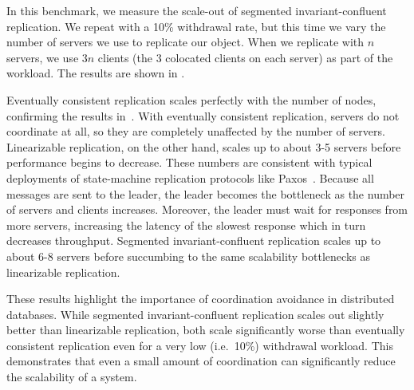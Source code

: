 \begin{benchmark}
  In this benchmark, we measure the scale-out of segmented invariant-confluent
  replication. We repeat  with a 10\% withdrawal rate,
  but this time we vary the number of servers we use to replicate our object.
  When we replicate with $n$ servers, we use $3n$ clients (the $3$ colocated
  clients on each server) as part of the workload. The results are shown in
  .

  Eventually consistent replication scales perfectly with the number of nodes,
  confirming the results in~\cite{bailis2014coordination}. With eventually
  consistent replication, servers do not coordinate at all, so they are
  completely unaffected by the number of servers. Linearizable replication, on
  the other hand, scales up to about 3-5 servers before performance begins to
  decrease. These numbers are consistent with typical deployments of
  state-machine replication protocols like Paxos~\cite{chandra2007paxos}.
  Because all messages are sent to the leader, the leader becomes the
  bottleneck as the number of servers and clients increases. Moreover, the
  leader must wait for responses from more servers, increasing the latency of
  the slowest response which in turn decreases throughput.
  Segmented invariant-confluent replication scales up to about 6-8 servers
  before succumbing to the same scalability bottlenecks as linearizable
  replication.

  These results highlight the importance of coordination avoidance in
  distributed databases. While segmented invariant-confluent replication scales
  out slightly better than linearizable replication, both scale significantly
  worse than eventually consistent replication even for a very low (i.e.\ 10\%)
  withdrawal workload. This demonstrates that even a small amount of
  coordination can significantly reduce the scalability of a system.
\end{benchmark}
